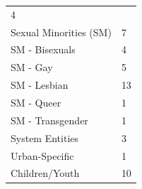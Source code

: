 \documentclass[]{tufte-handout}
\begin{document}
\begin{longtable}[]{@{}ll@{}}
\begin{minipage}[t]{0.21\columnwidth}
4\strut
\end{minipage}\tabularnewline
\begin{minipage}[t]{0.59\columnwidth}\raggedright\strut
Sexual Minorities (SM)\strut
\end{minipage} & \begin{minipage}[t]{0.21\columnwidth}\raggedright\strut
7\strut
\end{minipage}\tabularnewline
\begin{minipage}[t]{0.59\columnwidth}\raggedright\strut
SM - Bisexuals\strut
\end{minipage} & \begin{minipage}[t]{0.21\columnwidth}\raggedright\strut
4\strut
\end{minipage}\tabularnewline
\begin{minipage}[t]{0.59\columnwidth}\raggedright\strut
SM - Gay\strut
\end{minipage} & \begin{minipage}[t]{0.21\columnwidth}\raggedright\strut
5\strut
\end{minipage}\tabularnewline
\begin{minipage}[t]{0.59\columnwidth}\raggedright\strut
SM - Lesbian\strut
\end{minipage} & \begin{minipage}[t]{0.21\columnwidth}\raggedright\strut
13\strut
\end{minipage}\tabularnewline
\begin{minipage}[t]{0.59\columnwidth}\raggedright\strut
SM - Queer\strut
\end{minipage} & \begin{minipage}[t]{0.21\columnwidth}\raggedright\strut
1\strut
\end{minipage}\tabularnewline
\begin{minipage}[t]{0.59\columnwidth}\raggedright\strut
SM - Transgender\strut
\end{minipage} & \begin{minipage}[t]{0.21\columnwidth}\raggedright\strut
1\strut
\end{minipage}\tabularnewline
\begin{minipage}[t]{0.59\columnwidth}\raggedright\strut
System Entities\strut
\end{minipage} & \begin{minipage}[t]{0.21\columnwidth}\raggedright\strut
3\strut
\end{minipage}\tabularnewline
\begin{minipage}[t]{0.59\columnwidth}\raggedright\strut
Urban-Specific\strut
\end{minipage} & \begin{minipage}[t]{0.21\columnwidth}\raggedright\strut
1\strut
\end{minipage}\tabularnewline
\begin{minipage}[t]{0.59\columnwidth}\raggedright\strut
Children/Youth\strut
\end{minipage} & \begin{minipage}[t]{0.21\columnwidth}\raggedright\strut
10\strut
\end{minipage}\tabularnewline
\bottomrule
\end{longtable}
\end{document}
